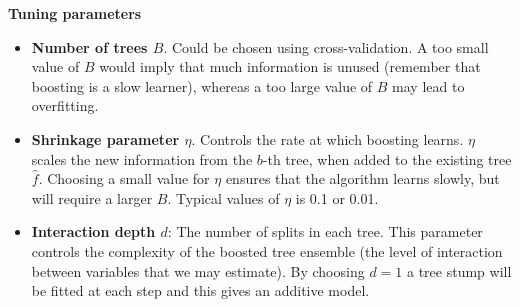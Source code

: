\documentclass[
  10pt,
  ignorenonframetext,
]{beamer}
\begin{document}
\begin{frame}
\textbf{Tuning parameters}

\begin{itemize}
\item
  \textbf{Number of trees \(B\)}. Could be chosen using
  cross-validation. A too small value of \(B\) would imply that much
  information is unused (remember that boosting is a slow learner),
  whereas a too large value of \(B\) may lead to overfitting.
\item
  \textbf{Shrinkage parameter \(\eta\)}. Controls the rate at which
  boosting learns. \(\eta\) scales the new information from the \(b\)-th
  tree, when added to the existing tree \(\hat{f}\). Choosing a small
  value for \(\eta\) ensures that the algorithm learns slowly, but will
  require a larger \(B\). Typical values of \(\eta\) is 0.1 or 0.01.
\item
  \textbf{Interaction depth \(d\)}: The number of splits in each tree.
  This parameter controls the complexity of the boosted tree ensemble
  (the level of interaction between variables that we may estimate). By
  choosing \(d=1\) a tree stump will be fitted at each step and this
  gives an additive model.
\end{itemize}
\end{frame}
\end{document}
